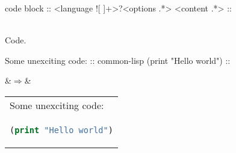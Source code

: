 \begin{identifier}{code block}
:: <language ![ ]+>?<options .*>
<content .*>
::
\end{identifier}
 \\

Code. \\

\begin{examples}
\begin{examplesource}
Some unexciting code:
:: common-lisp
(print "Hello world")
::
\end{examplesource}
  &$\Rightarrow$&
  \begin{tabular}{@{}l@{}}
Some unexciting code: \\
\begin{lstlisting}[style=codestyle,language=Lisp,showstringspaces=false]
(print "Hello world")
\end{lstlisting}
\end{tabular}
\end{examples}

